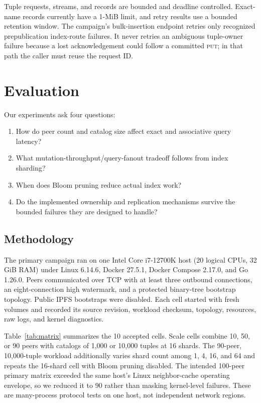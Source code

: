 \documentclass[conference]{IEEEtran}
\newcommand{\putop}{\textsc{put}\xspace}
\begin{document}
Tuple requests, streams, and records are bounded and deadline controlled.
Exact-name records currently have a 1-MiB limit, and retry results use a
bounded retention window. The campaign's bulk-insertion endpoint retries only
recognized prepublication index-route failures. It never retries an ambiguous
tuple-owner failure because a lost acknowledgement could follow a committed
\putop; in that path the caller must reuse the request ID.

\section{Evaluation}
\label{sec:evaluation}

Our experiments ask four questions:

\begin{enumerate}
  \item How do peer count and catalog size affect exact and associative query
  latency?
  \item What mutation-throughput/query-fanout tradeoff follows from index
  sharding?
  \item When does Bloom pruning reduce actual index work?
  \item Do the implemented ownership and replication mechanisms survive the
  bounded failures they are designed to handle?
\end{enumerate}

\subsection{Methodology}

The primary campaign ran on one Intel Core i7-12700K host (20 logical CPUs,
32 GiB RAM) under Linux 6.14.6, Docker 27.5.1, Docker Compose 2.17.0, and Go
1.26.0. Peers communicated over TCP with at least three outbound connections,
an eight-connection high watermark, and a protected binary-tree bootstrap
topology. Public IPFS bootstraps were disabled. Each cell started with fresh
volumes and recorded its source revision, workload checksum, topology,
resources, raw logs, and kernel diagnostics.

Table~\ref{tab:matrix} summarizes the 10 accepted cells. Scale cells combine
10, 50, or 90 peers with catalogs of 1,000 or 10,000 tuples at 16 shards. The
90-peer, 10,000-tuple workload additionally varies shard count among 1, 4, 16,
and 64 and repeats the 16-shard cell with Bloom pruning disabled. The intended
100-peer primary matrix exceeded the same host's Linux neighbor-cache
operating envelope, so we reduced it to 90 rather than masking kernel-level
failures. These are many-process protocol tests on one host, not independent
network regions.
\end{document}
